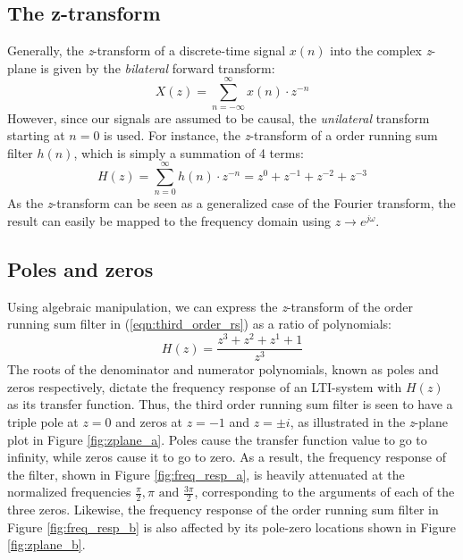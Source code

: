 \documentclass[journal]{IEEEtran}
\begin{document}
\subsection{The z-transform}
Generally, the \textit{z}-transform of a discrete-time signal $x(n)$ into the complex \textit{z}-plane is given by the \textit{bilateral} forward transform: 
\begin{equation}
\label{eqn:z_transform}
    X(z) = \sum_{n=-\infty}^{\infty} x(n) \cdot z^{-n}
\end{equation}
However, since our signals are assumed to be causal, the \textit{unilateral} transform starting at $n=0$ is used. For instance, the \textit{z}-transform of a  order running sum filter $h(n)$, which is simply a summation of 4 terms: 
\begin{equation}
\label{eqn:third_order_rs}
    H(z) = \sum_{n=0}^{\infty} h(n) \cdot z^{-n} = z^{0} + z^{-1} + z^{-2} + z^{-3} 
\end{equation}
As the \textit{z}-transform can be seen as a generalized case of the Fourier transform, the result can easily be mapped to the frequency domain using $z \rightarrow e^{j \omega}$.

\subsection{Poles and zeros}
Using algebraic manipulation, we can express the \textit{z}-transform of the  order running sum filter in (\ref{eqn:third_order_rs}) as a ratio of polynomials: 
\begin{equation}
\label{eqn:third_order_rs_tf}
    H(z) = \frac{z^3+z^2+z^1+1}{z^3}
\end{equation}
The roots of the denominator and numerator polynomials, known as poles and zeros respectively, dictate the frequency response of an LTI-system with $H(z)$ as its transfer function. Thus, the third order running sum filter is seen to have a triple pole at $z=0$ and zeros at $z=-1$ and $z=\pm i$, as illustrated in the \textit{z}-plane plot in Figure \ref{fig:zplane_a}. Poles cause the transfer function value to go to infinity, while zeros cause it to go to zero. As a result, the frequency response of the filter, shown in Figure \ref{fig:freq_resp_a}, is heavily attenuated at the normalized frequencies $\frac{\pi}{2}, \pi \text{ and } \frac{3 \pi}{2}$, corresponding to the arguments of each of the three zeros. Likewise, the frequency response of the  order running sum filter in Figure \ref{fig:freq_resp_b} is also affected by its pole-zero locations shown in Figure \ref{fig:zplane_b}. 
\end{document}
